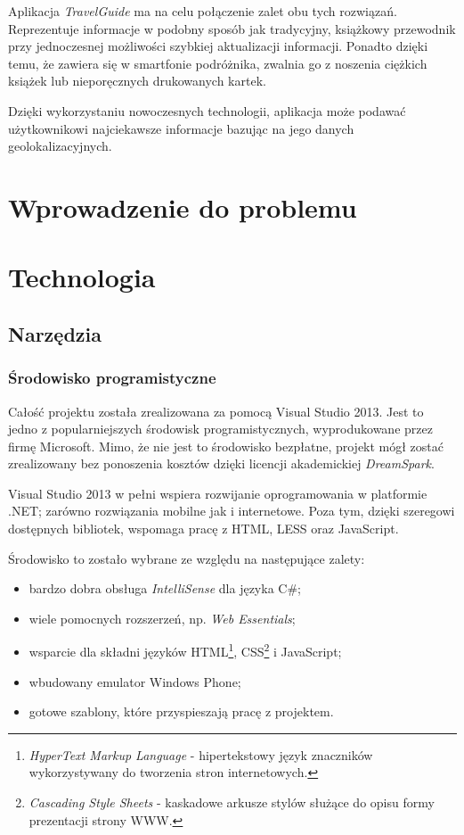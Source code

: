 \documentclass{book}
\newcommand{\appName}{\emph{TravelGuide} }
\begin{document}
		Aplikacja \appName ma na celu połączenie zalet obu tych rozwiązań. Reprezentuje informacje w podobny sposób jak tradycyjny, książkowy przewodnik przy jednoczesnej możliwości szybkiej aktualizacji informacji. Ponadto dzięki temu, że zawiera się w smartfonie podróżnika, zwalnia go z noszenia ciężkich książek lub nieporęcznych drukowanych kartek. 
			
		Dzięki wykorzystaniu nowoczesnych technologii, aplikacja może podawać użytkownikowi najciekawsze informacje bazując na jego danych geolokalizacyjnych. 
	
	
	\chapter{Wprowadzenie do problemu}
	
	\chapter{Technologia}
		\section{Narzędzia}		
			\subsection{Środowisko programistyczne}
				
			Całość projektu została zrealizowana za pomocą Visual Studio 2013. Jest to jedno z popularniejszych środowisk programistycznych, wyprodukowane przez firmę Microsoft. Mimo, że nie jest to środowisko bezpłatne, projekt mógł zostać zrealizowany bez ponoszenia kosztów dzięki licencji akademickiej \textit{DreamSpark}. 
			
			Visual Studio 2013 w pełni wspiera rozwijanie oprogramowania w platformie .NET; zarówno rozwiązania mobilne jak i internetowe. Poza tym, dzięki szeregowi dostępnych bibliotek, wspomaga pracę z HTML, LESS oraz JavaScript.
			
			Środowisko to zostało wybrane ze względu na następujące zalety:
			\begin{itemize}
				\item bardzo  dobra obsługa \textit{IntelliSense} dla języka C\#;
				\item wiele pomocnych rozszerzeń, np. \textit{Web Essentials};
				\item wsparcie dla składni języków HTML\footnote{\emph{HyperText Markup Language} - hipertekstowy język znaczników wykorzystywany do tworzenia stron internetowych.}, CSS\footnote{\emph{Cascading Style Sheets} - kaskadowe arkusze stylów służące do opisu formy prezentacji strony WWW.} i JavaScript;
				\item wbudowany emulator Windows Phone;
				\item gotowe szablony, które przyspieszają pracę z projektem.
			\end{itemize}
			
\end{document}
